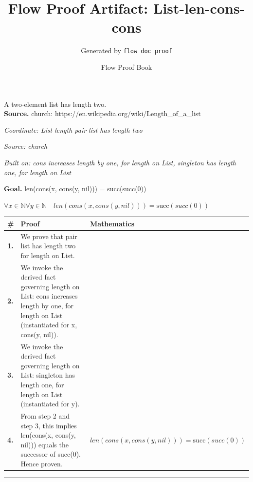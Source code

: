 \documentclass[11pt]{article}
\title{Flow Proof Artifact: List-len-cons-cons}
\author{Generated by \texttt{flow doc proof}}
\date{Flow Proof Book}
\theoremstyle{definition}
\begin{document}
\maketitle
A two-element list has length two.\\[0.5em]
\textbf{Source.} church: https://en.wikipedia.org/wiki/Length\_of\_a\_list\\[0.5em]
\bigskip
{}\par
\smallskip\noindent\textit{Coordinate: List \cdot length \cdot pair list has length two}\par
\smallskip\noindent\textit{Source: church}\par
\smallskip\noindent\textit{Built on: cons increases length by one, for length on List, singleton has length one, for length on List}\par
\medskip
\noindent\textbf{Goal.} len(cons(x, cons(y, nil))) = succ(succ(0))\par
\noindent$\displaystyle \forall x \in \mathbb{N} \forall y \in \mathbb{N}\quad len(cons(x, cons(y, nil))) = \mathrm{succ}(succ(0))$\par
\medskip
\noindent
\begin{tabular}{@{} >{\raggedright\arraybackslash}p{} >{\raggedright\arraybackslash}p{} >{\raggedleft\arraybackslash}p{} @{}}
\textbf{\#} & \textbf{Proof} & \textbf{Mathematics} \\
\midrule
\textbf{1.} & We prove that pair list has length two for length on List. & \\[0.45em]
\textbf{2.} & We invoke the derived fact governing length on List: cons increases length by one, for length on List (instantiated for x, cons(y, nil)). & \\[0.45em]
\textbf{3.} & We invoke the derived fact governing length on List: singleton has length one, for length on List (instantiated for y). & \\[0.45em]
\textbf{4.} & From step 2 and step 3, this implies len(cons(x, cons(y, nil))) equals the successor of succ(0). Hence proven. & $\displaystyle len(cons(x, cons(y, nil))) = \mathrm{succ}(succ(0))$ \\[0.45em]
\bottomrule
\end{tabular}
\label{thm:List-length-pair_list_has_length_two}
\par\medskip\hrule
\end{document}

